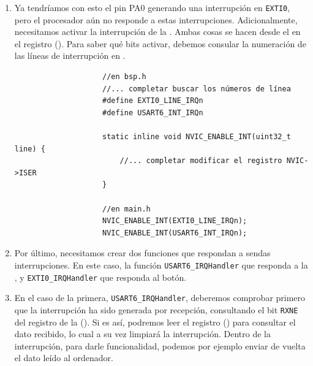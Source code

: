 \documentclass[../main.tex]{subfiles}
\begin{document}
\begin{enumerate}
\begin{lstlisting}
                    //en main.c
                    RCC_APB2ENR->bits.SYSCFGEN = 1;
                    //Activar EINT0 PUERTO A
                    SYSCFG_EINT_MAP_PORT(0, 0); //port a (0) to eint0
                    EXTI_ENABLE_RISING_TRIGGER(0, 1); 	//enable on port a
                    EXTI_UNMASK_INTERRUPT(0, 1);		//unmask on port a
                \end{lstlisting}
            \item Ya tendríamos con esto el pin PA0 generando una interrupción en \texttt{EXTI0}, pero el procesador aún no responde a estas interrupciones. Adicionalmente, necesitamos activar la interrupción de la . Ambas cosas se hacen desde el  en el registro  (\PMMAN[4.2.2]). Para saber qué bits activar, debemos consular la numeración de las líneas de interrupción en \REFMAN[9].
            
                \begin{lstlisting}
                    //en bsp.h
                    //... completar buscar los números de línea
                    #define EXTI0_LINE_IRQn
                    #define USART6_INT_IRQn

                    static inline void NVIC_ENABLE_INT(uint32_t line) {
                        //... completar modificar el registro NVIC->ISER
                    }

                    //en main.h
                    NVIC_ENABLE_INT(EXTI0_LINE_IRQn);
	                NVIC_ENABLE_INT(USART6_INT_IRQn);
                \end{lstlisting}

            \item Por último, necesitamos crear dos funciones que respondan a sendas interrupciones. En este caso, la función \lstinline|USART6_IRQHandler| que responda a la , y \lstinline|EXTI0_IRQHandler| que responda al botón.
            \item En el caso de la primera, \lstinline|USART6_IRQHandler|, deberemos comprobar primero que la interrupción ha sido generada por recepción, consultando el bit \texttt{RXNE} del registro  de la  (\REFMAN[27.8.8]). Si es así, podremos leer el registro  (\REFMAN[27.8.10]) para consultar el dato recibido, lo cual a su vez limpiará la interrupción. Dentro de la interrupción, para darle funcionalidad, podemos por ejemplo enviar de vuelta el dato leído al ordenador.
            

\end{enumerate}
\end{document}
